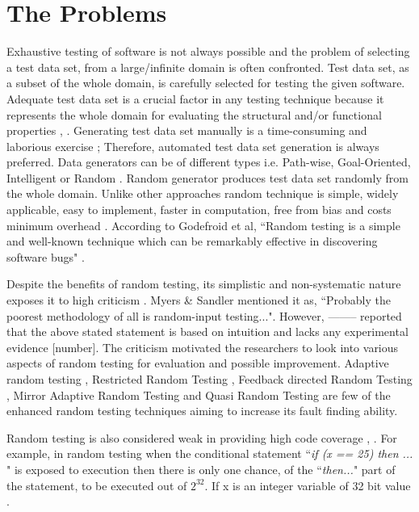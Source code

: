 \section{The Problems}
Exhaustive testing of software is not always possible and the problem of selecting a test data set, from a large/infinite domain is often confronted. Test data set, as a subset of the whole domain, is carefully selected for testing the given software. Adequate test data set is a crucial factor in any testing technique because it represents the whole domain for evaluating the structural and/or functional properties \cite{howden1986}, \cite{mccabe1983}. Generating test data set manually is a time-consuming and laborious exercise \cite{korel1990}; Therefore, automated test data set generation is always preferred. Data generators can be of different types i.e. Path-wise, Goal-Oriented, Intelligent or Random \cite{wiki2013}. Random generator produces test data set randomly from the whole domain. Unlike other approaches random technique is simple, widely applicable, easy to implement, faster in computation, free from bias and costs minimum overhead \cite{Ciupa2007}.  According to Godefroid et al, ``Random testing is a simple and well-known technique which can be remarkably effective in discovering software bugs" \cite{Godefroid2005}.

Despite the benefits of random testing, its simplistic and non-systematic nature exposes it to high criticism \cite{white1987}. Myers \& Sandler \cite{Myers2004} mentioned it as, ``Probably the poorest methodology of all is random-input testing...". However, -------- reported that the above stated statement is based on intuition and lacks any experimental evidence [number]. The criticism motivated the researchers to look into various aspects of random testing for evaluation and possible improvement. Adaptive random testing \cite{Chen2008}, Restricted Random Testing \cite{Chan2002}, Feedback directed Random Testing \cite{Pacheco2007a}, Mirror Adaptive Random Testing \cite{Chen2003} and Quasi Random Testing \cite{Chen2005} are few of the enhanced random testing techniques aiming to increase its fault finding ability. 

Random testing is also considered weak in providing high code coverage \cite{cohen1997}, \cite{Offutt1996}. For example, in random testing when the conditional statement  ``{\it if (x == 25) then ... }"  is exposed to execution then there is only one chance, of the ``{\it then...}" part of the statement, to be executed out of $2^\text{32}$. If x is an integer variable of 32 bit value \cite{Godefroid2005}. 

